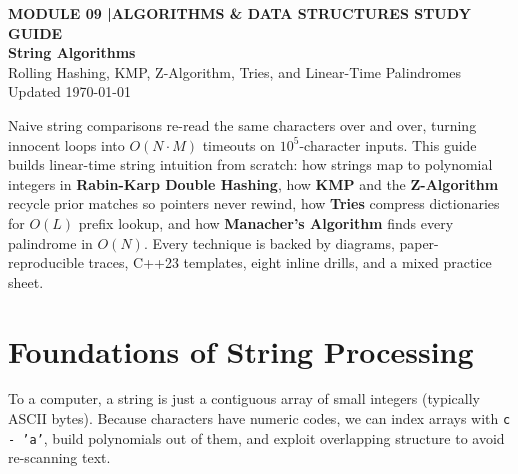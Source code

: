 \documentclass[11pt,a4paper]{article}
\newcommand{\sectionbreak}{}
\theoremstyle{definition}
\begin{document}
\thispagestyle{plain}
\begin{tcolorbox}[
    enhanced,
    colback=primaryblue!6, colframe=primaryblue!20,
    borderline west={5pt}{0pt}{primaryblue},
    arc=4pt, boxrule=0.6pt,
    left=14pt, right=14pt, top=7pt, bottom=7pt,
    before skip=0pt, after skip=5pt
]
    {\footnotesize\bfseries\color{accentteal}MODULE 09 \quad|\quad ALGORITHMS \& DATA STRUCTURES STUDY GUIDE}\\[3pt]
    {\Huge\bfseries\color{primaryblue}String Algorithms}\\[3pt]
    {\large\color{codegray}Rolling Hashing, KMP, Z-Algorithm, Tries, and Linear-Time Palindromes}\\[4pt]
    {\footnotesize\color{codegray}Updated \today}
\end{tcolorbox}

\begin{overviewbox}
Naive string comparisons re-read the same characters over and over, turning innocent loops into $O(N \cdot M)$ timeouts on $10^5$-character inputs. This guide builds linear-time string intuition from scratch: how strings map to polynomial integers in \textbf{Rabin-Karp Double Hashing}, how \textbf{KMP} and the \textbf{Z-Algorithm} recycle prior matches so pointers never rewind, how \textbf{Tries} compress dictionaries for $O(L)$ prefix lookup, and how \textbf{Manacher's Algorithm} finds every palindrome in $O(N)$. Every technique is backed by diagrams, paper-reproducible traces, C++23 templates, eight inline drills, and a mixed practice sheet.
\end{overviewbox}

\vspace{-5pt}
{\setlength{\parskip}{0pt}\footnotesize\tableofcontents}

\renewcommand{\sectionbreak}{\clearpage}

\section{Foundations of String Processing}

To a computer, a string is just a contiguous array of small integers (typically ASCII bytes). Because characters have numeric codes, we can index arrays with \texttt{c - 'a'}, build polynomials out of them, and exploit overlapping structure to avoid re-scanning text.
\end{document}
